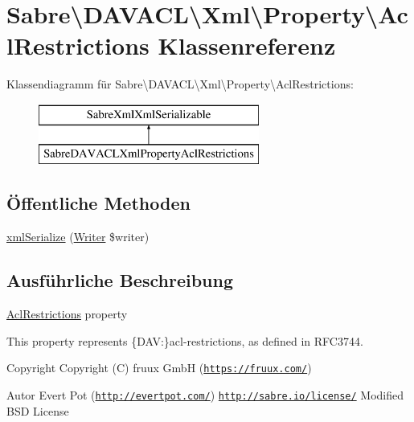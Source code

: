 \hypertarget{class_sabre_1_1_d_a_v_a_c_l_1_1_xml_1_1_property_1_1_acl_restrictions}{}\section{Sabre\textbackslash{}D\+A\+V\+A\+CL\textbackslash{}Xml\textbackslash{}Property\textbackslash{}Acl\+Restrictions Klassenreferenz}
\label{class_sabre_1_1_d_a_v_a_c_l_1_1_xml_1_1_property_1_1_acl_restrictions}
Klassendiagramm für Sabre\textbackslash{}D\+A\+V\+A\+CL\textbackslash{}Xml\textbackslash{}Property\textbackslash{}Acl\+Restrictions\+:\begin{figure}[H]
\begin{center}
\leavevmode
\includegraphics[height=2.000000cm]{class_sabre_1_1_d_a_v_a_c_l_1_1_xml_1_1_property_1_1_acl_restrictions}
\end{center}
\end{figure}
\subsection*{Öffentliche Methoden}
\begin{DoxyCompactItemize}
\item 
\mbox{\hyperlink{class_sabre_1_1_d_a_v_a_c_l_1_1_xml_1_1_property_1_1_acl_restrictions_ab8c6081b610ad90690a1aca367a93ebe}{xml\+Serialize}} (\mbox{\hyperlink{class_sabre_1_1_xml_1_1_writer}{Writer}} \$writer)
\end{DoxyCompactItemize}


\subsection{Ausführliche Beschreibung}
\mbox{\hyperlink{class_sabre_1_1_d_a_v_a_c_l_1_1_xml_1_1_property_1_1_acl_restrictions}{Acl\+Restrictions}} property

This property represents \{D\+AV\+:\}acl-\/restrictions, as defined in R\+F\+C3744.

\begin{DoxyCopyright}{Copyright}
Copyright (C) fruux GmbH (\href{https://fruux.com/}{\tt https\+://fruux.\+com/}) 
\end{DoxyCopyright}
\begin{DoxyAuthor}{Autor}
Evert Pot (\href{http://evertpot.com/}{\tt http\+://evertpot.\+com/})  \href{http://sabre.io/license/}{\tt http\+://sabre.\+io/license/} Modified B\+SD License 
\end{DoxyAuthor}


